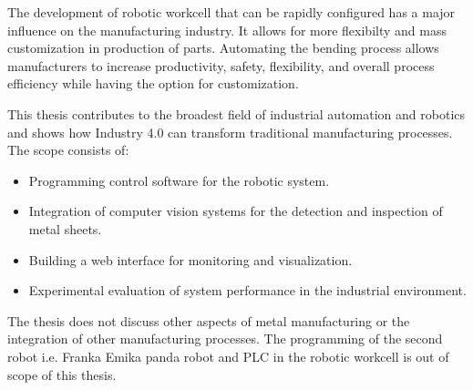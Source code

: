 The development of robotic workcell that can be rapidly configured has a major influence on the manufacturing industry. It allows for more flexibilty and mass customization in production of parts. \cite{CHEN2001199} Automating the bending process allows manufacturers to increase productivity, safety, flexibility, and overall process efficiency while having the option for customization. \cite[page 9]{russmann2015industry} 

This thesis contributes to the broadest field of industrial automation and robotics and shows how Industry 4.0 can transform traditional manufacturing processes.
The scope consists of:
\begin{itemize}
    \item Programming control software for the robotic system. 
    \item Integration of computer vision systems for the detection and inspection of metal sheets.
    \item Building a web interface for monitoring and visualization.
    \item Experimental evaluation of system performance in the industrial environment. 
\end{itemize}

The thesis does not discuss other aspects of metal manufacturing or the integration of other manufacturing processes.
The programming of the second robot i.e. Franka Emika panda robot and PLC in the robotic workcell is out of scope of this thesis.
